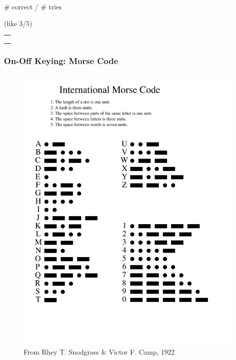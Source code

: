 \documentclass[11pt]{article}
\begin{document}
\# correct / \# tries

(like 3/5)

\begin{longtable}[]{@{}l@{}}
\toprule
 \\
\midrule
\endhead
 \\
 \\
 \\
\bottomrule
\end{longtable}

    \hypertarget{on-off-keying-morse-code}{%
\subsubsection*{On-Off Keying: Morse
Code}\label{on-off-keying-morse-code}}

\begin{figure}
\centering
\includegraphics{plots/morse.pdf}
\caption{From Rhey T. Snodgrass \& Victor F. Camp, 1922}
\end{figure}
\end{document}
